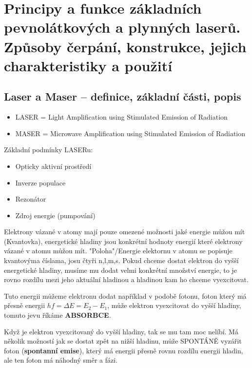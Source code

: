\documentclass[a4paper, 12pt]{article}
\begin{document}
        
    \section{Principy a funkce základních pevnolátkových a plynných laserů. Způsoby čerpání, konstrukce, jejich charakteristiky a použití}
        \subsection{Laser a Maser – definice, základní části, popis}
            \begin{itemize}
                \item LASER = Light Amplification using Stimulated Emission of Radiation
                \item MASER = Microwave Amplification using Stimulated Emission of Radiation
            \end{itemize}
            Základní podmínky LASERu:
            \begin{itemize}
                \item Opticky aktivní prostředí
                \item Inverze populace
                \item Rezonátor
                \item Zdroj energie (pumpování)
            \end{itemize}
            Elektrony vázané v atomy mají pouze omezené možnosti jaké energie můžou mít (Kvantovka),
            energetické hladiny jsou konkrétní hodnoty energií které elektrony vázané v atomu můžou mít.
            "Poloha"/Energie elektornu v atomu se popisuje kvantovýma číslama, josu čtyři n,l,m,s. 
            Pokud chceme dostat elektron do vyšší energetické hladiny, musíme mu dodat velmi konkrétní množství energie,
            to je rovno rozdílu mezi jeho aktuální hladinou a hladinou kam ho chceme vyexcitovat.
            
            Tuto energii můžeme elektronu dodat například v podobě fotonu, foton který má přesně energii
            $hf=\Delta E=E_2-E_1$, může elektron vyexcitovat do vyšší hladiny, tomuto jevu říkáme \textbf{ABSORBCE}.
            
            Když je elektron vyexcitovaný do vyšší hladiny, tak se mu tam moc nelíbí. Má několik možností 
            jak se dostat zpět na nižší hladinu, může SPONTÁNĚ vyzářit foton (\textbf{spontanní emise}), který má energii
            přesně rovnu rozdílu energii hladin, ale ten foton má náhodný směr a fázi. 
            
\end{document}
